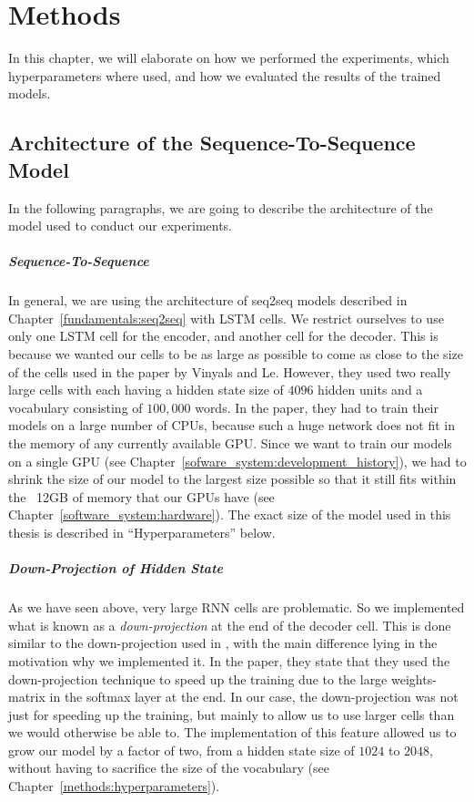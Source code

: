 \chapter{Methods}
\label{methods}
In this chapter, we will elaborate on how we performed the experiments, which hyperparameters where used, and how we evaluated the results of the trained models.

\section{Architecture of the Sequence-To-Sequence Model}
In the following paragraphs, we are going to describe the architecture of the model used to conduct our experiments.

\paragraph{Sequence-To-Sequence} In general, we are using the architecture of seq2seq models described in Chapter~\ref{fundamentals:seq2seq} with LSTM cells. We restrict ourselves to use only one LSTM cell for the encoder, and another cell for the decoder. This is because we wanted our cells to be as large as possible to come as close to the size of the cells used in the paper by Vinyals and Le\cite{Vinyals:2015}. However, they used two really large cells with each having a hidden state size of $4096$ hidden units and a vocabulary consisting of $100,000$ words. In the paper, they had to train their models on a large number of CPUs, because such a huge network does not fit in the memory of any currently available GPU. Since we want to train our models on a single GPU (see Chapter~\ref{sofware_system:development_history}), we had to shrink the size of our model to the largest size possible so that it still fits within the ~12GB of memory that our GPUs have (see Chapter~\ref{software_system:hardware}). The exact size of the model used in this thesis is described in ``Hyperparameters'' below.

\paragraph{Down-Projection of Hidden State} As we have seen above, very large RNN cells are problematic. So we implemented what is known as a \emph{down-projection} at the end of the decoder cell. This is done similar to the down-projection used in \cite{Vinyals:2015}, with the main difference lying in the motivation why we implemented it. In the paper, they state that they used the down-projection technique to speed up the training due to the large weights-matrix in the softmax layer at the end. In our case, the down-projection was not just for speeding up the training, but mainly to allow us to use larger cells than we would otherwise be able to. The implementation of this feature allowed us to grow our model by a factor of two, from a hidden state size of $1024$ to $2048$, without having to sacrifice the size of the vocabulary (see Chapter~\ref{methods:hyperparameters}).

